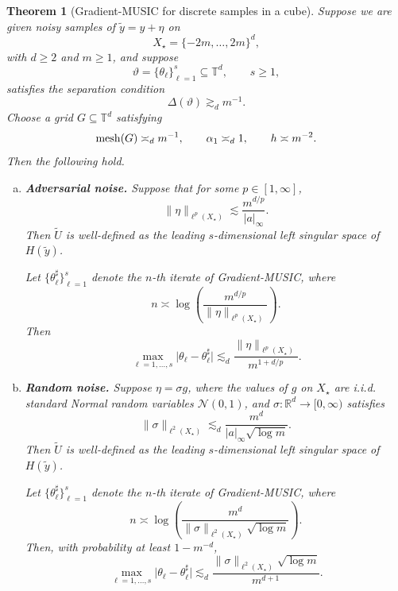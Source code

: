 \documentclass[11pt]{article}
\newtheorem{theorem}{Theorem}
\theoremstyle{definition}
\numberwithin{theorem}{section}
\numberwithin{lemma}{section}
\numberwithin{equation}{section}
\def\R{\mathbb{R}}
\def\T{\mathbb{T}}
\renewcommand{\subset}{\subseteq}
\renewcommand{\tilde}{\widetilde}
\newcommand{\mesh}{{\rm mesh}}
\newcommand{\sampset}{X}
\numberwithin{equation}{section}
\begin{document}
\begin{theorem}[Gradient-MUSIC for discrete samples in a cube]
\label{thm:maincube}
Suppose we are given noisy samples of $\tilde y=y+\eta$ on
\[
\sampset_\star=\{-2m,\dots,2m\}^d,
\]
with $d\ge 2$ and $m\ge 1$, and suppose
\[
\vartheta=\{\theta_\ell\}_{\ell=1}^s\subset \T^d,
\qquad s\ge 1,
\]
satisfies the separation condition
\[
\Delta(\vartheta)\gtrsim_d m^{-1}.
\]
Choose a grid $G\subset \T^d$ satisfying
\[
\mesh(G)\asymp_d m^{-1},
\qquad
\alpha_1\asymp_d 1,
\qquad
h\asymp m^{-2}.
\]
Then the following hold.

\begin{enumerate}[(a)]
\item \textbf{Adversarial noise.}
Suppose that for some $p\in[1,\infty]$,
\begin{equation}
\label{eq:etacondcube}
\|\eta\|_{\ell^p(\sampset_\star)}
\lesssim
\frac{m^{d/p}}{|a|_\infty}.
\end{equation}
Then $\tilde U$ is well-defined as the leading $s$-dimensional left singular space of $H(\tilde y)$. 

Let $\{\theta_\ell^\sharp\}_{\ell=1}^s$ denote the $n$-th iterate of Gradient-MUSIC, where
\begin{equation}
\label{eq:ngraditercube1}
n\asymp
\log\!\left(
\frac{m^{d/p}}{\|\eta\|_{\ell^p(\sampset_\star)}}
\right).
\end{equation}
Then
\begin{equation}
\label{eq:cubecasea}
\max_{\ell=1,\dots,s}
\bigl|\theta_\ell-\theta_\ell^\sharp\bigr|
\lesssim_d
\frac{\|\eta\|_{\ell^p(\sampset_\star)}}{m^{1+d/p}}.
\end{equation}

\item \textbf{Random noise.}
Suppose $\eta=\sigma g$, where the values of $g$ on $\sampset_\star$ are i.i.d. standard Normal random variables $\mathcal N(0,1)$, and $\sigma\colon\R^d\to[0,\infty)$ satisfies
\begin{equation}
\label{eq:sigmasizecondcube}
\|\sigma\|_{\ell^2(\sampset_\star)}
\lesssim_d
\frac{m^d}{|a|_\infty\sqrt{\log m}}.
\end{equation}
Then $\tilde U$ is well-defined as the leading $s$-dimensional left singular space of $H(\tilde y)$. 

Let $\{\theta_\ell^\sharp\}_{\ell=1}^s$ denote the $n$-th iterate of Gradient-MUSIC, where
\begin{equation}
n\asymp
\log\!\left(
\frac{m^d}{\|\sigma\|_{\ell^2(\sampset_\star)}\sqrt{\log m}}
\right).
\end{equation}
Then, with probability at least $1-m^{-d}$,
\begin{equation}
\label{eq:cubecaseb}
\max_{\ell=1,\dots,s}
\bigl|\theta_\ell-\theta_\ell^\sharp\bigr|
\lesssim_d
\frac{\|\sigma\|_{\ell^2(\sampset_\star)}\sqrt{\log m}}{m^{d+1}}.
\end{equation}
\end{enumerate}
\end{theorem}
\end{document}
